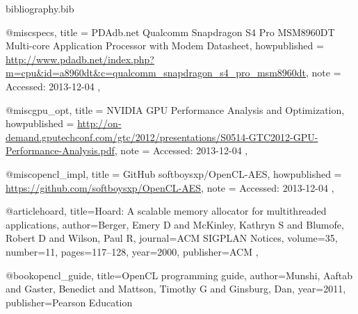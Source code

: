 \documentclass[conference,10pt]{IEEEtran}
\begin{document}
% 
% 
% 
% 
% 


\begin{filecontents*}{bibliography.bib}

    @misc{specs,
        title = {{PDAdb.net} Qualcomm Snapdragon S4 Pro MSM8960DT Multi-core Application Processor 
        with Modem Datasheet},
        howpublished = 
        {\url{http://www.pdadb.net/index.php?m=cpu&id=a8960dt&c=qualcomm_snapdragon_s4_pro_msm8960dt}},
        note = {Accessed: 2013-12-04}
    },

    @misc{gpu_opt,
        title = {{NVIDIA} GPU Performance Analysis and Optimization},
        howpublished = 
        {\url{http://on-demand.gputechconf.com/gtc/2012/presentations/S0514-GTC2012-GPU-Performance-Analysis.pdf}},
        note = {Accessed: 2013-12-04}
    },

    @misc{opencl_impl,
        title = {{GitHub} softboysxp/OpenCL-AES},
        howpublished = {\url{https://github.com/softboysxp/OpenCL-AES}},
        note = {Accessed: 2013-12-04}
    },

    @article{hoard,
        title={Hoard: A scalable memory allocator for multithreaded applications},
        author={Berger, Emery D and McKinley, Kathryn S and Blumofe, Robert D and Wilson, Paul R},
        journal={ACM SIGPLAN Notices},
        volume={35},
        number={11},
        pages={117--128},
        year={2000},
        publisher={ACM}
    },

    @book{opencl_guide,
        title={OpenCL programming guide},
        author={Munshi, Aaftab and Gaster, Benedict and Mattson, Timothy G and Ginsburg, Dan},
        year={2011},
        publisher={Pearson Education}
    }

\end{filecontents*}




\end{document}
